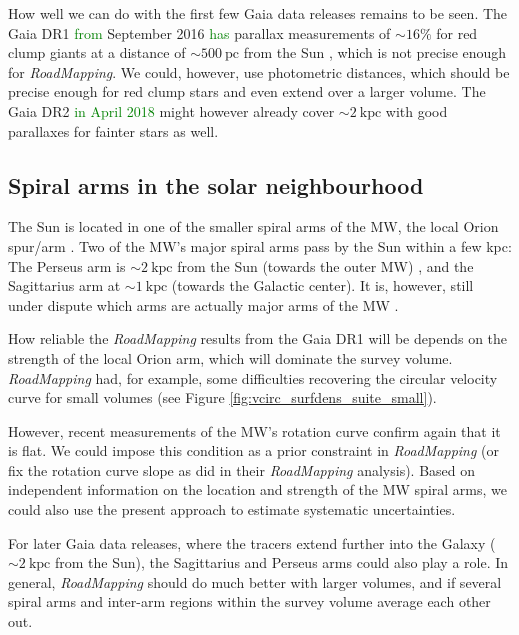\documentclass[iop,revtex4,numberedappendix,appendixfloats]{emulateapj}
\newcommand{\RM}{{\sl RoadMapping}}
\newcommand{\NEW}[1]{\textcolor{Green}{#1}}
\newcommand{\OLD}[1]{}
\begin{document}
How well we can do with the first few Gaia data releases remains to be seen. The Gaia DR1 \OLD{in}\NEW{from} September 2016 \OLD{will have}\NEW{has} parallax measurements of $\sim16\%$ for red clump giants at a distance of $\sim 500~\text{pc}$ from the Sun \citep{2014EAS....67...23D,2015A&A...574A.115M}, which is not precise enough for \RM{}. We could, however, use photometric distances, which should be precise enough for red clump stars and even extend over a larger volume. The Gaia DR2 \OLD{at the end of 2017}\NEW{in April 2018} might however already cover $\sim 2~\text{kpc}$ with good parallaxes for fainter stars as well.

\subsection{Spiral arms in the solar neighbourhood} \label{sec:discussion_sun_location}

The Sun is located in one of the smaller spiral arms of the MW, the local Orion spur/arm \citep{1953ApJ...118..318M}. Two of the MW's major spiral arms pass by the Sun within a few kpc: The Perseus arm is $\sim2~\text{kpc}$ from the Sun (towards the outer MW) \citep{2006Sci...311...54X}, and the Sagittarius arm at $\sim1~\text{kpc}$ \citep{2010PASJ...62..287S} (towards the Galactic center). It is, however, still under dispute which arms are actually major arms of the MW \citep{1985IAUS..106..335B,2013ApJ...769...15X,2013ApJ...775...79Z}.

How reliable the \RM{} results from the Gaia DR1 will be depends on the strength of the local Orion arm, which will dominate the survey volume. \RM{} had, for example, some difficulties recovering the circular velocity curve for small volumes (see Figure \ref{fig:vcirc_surfdens_suite_small}).

However, recent measurements of the MW's rotation curve \citep{2012ApJ...759..131B,2014ApJ...783..130R} confirm again that it is flat. We could impose this condition as a prior constraint in \RM{} (or fix the rotation curve slope as \citet{2013ApJ...779..115B} did in their \RM{} analysis). Based on independent information on the location and strength of the MW spiral arms, we could also use the present approach to estimate systematic uncertainties.

For later Gaia data releases, where the tracers extend further into the Galaxy ($\sim2~\text{kpc}$ from the Sun), the Sagittarius and Perseus arms could also play a role. In general, \RM{} should do much better with larger volumes, and if several spiral arms and inter-arm regions within the survey volume average each other out.
\end{document}
